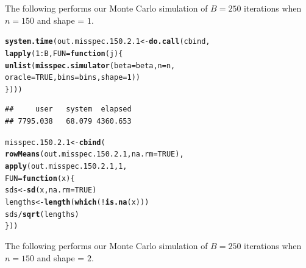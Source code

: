 \documentclass[11pt]{article}\usepackage[]{graphicx}\usepackage[]{color}
\makeatletter
\newcommand{\hlnum}[1]{\textcolor[rgb]{0.686,0.059,0.569}{#1}}%
\newcommand{\hlopt}[1]{\textcolor[rgb]{0,0,0}{#1}}%
\newcommand{\hlstd}[1]{\textcolor[rgb]{0.345,0.345,0.345}{#1}}%
\newcommand{\hlkwa}[1]{\textcolor[rgb]{0.161,0.373,0.58}{\textbf{#1}}}%
\newcommand{\hlkwb}[1]{\textcolor[rgb]{0.69,0.353,0.396}{#1}}%
\newcommand{\hlkwc}[1]{\textcolor[rgb]{0.333,0.667,0.333}{#1}}%
\newcommand{\hlkwd}[1]{\textcolor[rgb]{0.737,0.353,0.396}{\textbf{#1}}}%
\newenvironment{kframe}{%
 \def\at@end@of@kframe{}%
 \ifinner\ifhmode%
  \def\at@end@of@kframe{\end{minipage}}%
  \begin{minipage}{\columnwidth}%
 \fi\fi%
 \def\FrameCommand##1{\hskip\@totalleftmargin \hskip-\fboxsep
 \colorbox{shadecolor}{##1}\hskip-\fboxsep
     \hskip-\linewidth \hskip-\@totalleftmargin \hskip\columnwidth}%
 \MakeFramed {\advance\hsize-\width
   \@totalleftmargin\z@ \linewidth\hsize
   \@setminipage}}%
 {\par\unskip\endMakeFramed%
 \at@end@of@kframe}
\newenvironment{knitrout}{}{} %
\makeatother
\begin{document}
The following performs our Monte Carlo simulation of $B = 250$ iterations 
when $n = 150$ and shape = $1$.

\begin{knitrout}
\color{fgcolor}\begin{kframe}
\begin{alltt}
\hlkwd{system.time}\hlstd{(out.misspec.150.2.1} \hlkwb{<-} \hlkwd{do.call}\hlstd{(cbind,}
  \hlkwd{lapply}\hlstd{(}\hlnum{1}\hlopt{:}\hlstd{B,} \hlkwc{FUN} \hlstd{=} \hlkwa{function}\hlstd{(}\hlkwc{j}\hlstd{)\{}
    \hlkwd{unlist}\hlstd{(}\hlkwd{misspec.simulator}\hlstd{(}\hlkwc{beta} \hlstd{= beta,} \hlkwc{n} \hlstd{= n,}
      \hlkwc{oracle} \hlstd{=} \hlnum{TRUE}\hlstd{,} \hlkwc{bins} \hlstd{= bins,} \hlkwc{shape} \hlstd{=} \hlnum{1}\hlstd{))}
\hlstd{\})))}
\end{alltt}
\begin{verbatim}
##     user   system  elapsed 
## 7795.038   68.079 4360.653
\end{verbatim}
\end{kframe}
\end{knitrout}

\begin{knitrout}
\color{fgcolor}\begin{kframe}
\begin{alltt}
\hlstd{misspec.150.2.1} \hlkwb{<-} \hlkwd{cbind}\hlstd{(}
  \hlkwd{rowMeans}\hlstd{(out.misspec.150.2.1,} \hlkwc{na.rm} \hlstd{=} \hlnum{TRUE}\hlstd{),}
  \hlkwd{apply}\hlstd{(out.misspec.150.2.1,} \hlnum{1}\hlstd{,}
  \hlkwc{FUN} \hlstd{=} \hlkwa{function}\hlstd{(}\hlkwc{x}\hlstd{)\{}
    \hlstd{sds} \hlkwb{<-} \hlkwd{sd}\hlstd{(x,} \hlkwc{na.rm} \hlstd{=} \hlnum{TRUE}\hlstd{)}
    \hlstd{lengths} \hlkwb{<-} \hlkwd{length}\hlstd{(}\hlkwd{which}\hlstd{(}\hlopt{!}\hlkwd{is.na}\hlstd{(x)))}
    \hlstd{sds} \hlopt{/} \hlkwd{sqrt}\hlstd{(lengths)}
  \hlstd{\}))}
\end{alltt}
\end{kframe}
\end{knitrout}

The following performs our Monte Carlo simulation of $B = 250$ iterations 
when $n = 150$ and shape = $2$.
\end{document}
